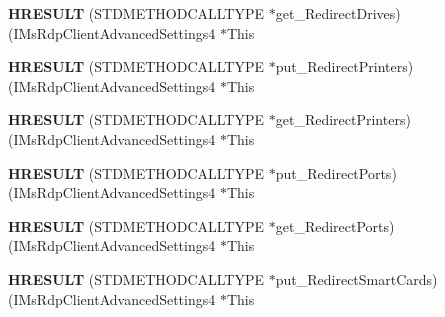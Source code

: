 \begin{DoxyCompactItemize}
\item 
\mbox{\label{struct_i_ms_rdp_client_advanced_settings4_vtbl_a30b7ac330d0b8023a87af0b2d53428a6}} 
{\bfseries H\+R\+E\+S\+U\+LT} (S\+T\+D\+M\+E\+T\+H\+O\+D\+C\+A\+L\+L\+T\+Y\+PE $\ast$get\+\_\+\+Redirect\+Drives)(I\+Ms\+Rdp\+Client\+Advanced\+Settings4 $\ast$This
\item 
\mbox{\label{struct_i_ms_rdp_client_advanced_settings4_vtbl_aaec94c2b7b26e97f7b8e3cb09b70a0ab}} 
{\bfseries H\+R\+E\+S\+U\+LT} (S\+T\+D\+M\+E\+T\+H\+O\+D\+C\+A\+L\+L\+T\+Y\+PE $\ast$put\+\_\+\+Redirect\+Printers)(I\+Ms\+Rdp\+Client\+Advanced\+Settings4 $\ast$This
\item 
\mbox{\label{struct_i_ms_rdp_client_advanced_settings4_vtbl_a376eefe33db8fe926dcd11e6e7f6e3b3}} 
{\bfseries H\+R\+E\+S\+U\+LT} (S\+T\+D\+M\+E\+T\+H\+O\+D\+C\+A\+L\+L\+T\+Y\+PE $\ast$get\+\_\+\+Redirect\+Printers)(I\+Ms\+Rdp\+Client\+Advanced\+Settings4 $\ast$This
\item 
\mbox{\label{struct_i_ms_rdp_client_advanced_settings4_vtbl_add1db4a3b25e68c3799e127320af9680}} 
{\bfseries H\+R\+E\+S\+U\+LT} (S\+T\+D\+M\+E\+T\+H\+O\+D\+C\+A\+L\+L\+T\+Y\+PE $\ast$put\+\_\+\+Redirect\+Ports)(I\+Ms\+Rdp\+Client\+Advanced\+Settings4 $\ast$This
\item 
\mbox{\label{struct_i_ms_rdp_client_advanced_settings4_vtbl_ab755c97ffa77ea0e7c9a9effa7eed4f1}} 
{\bfseries H\+R\+E\+S\+U\+LT} (S\+T\+D\+M\+E\+T\+H\+O\+D\+C\+A\+L\+L\+T\+Y\+PE $\ast$get\+\_\+\+Redirect\+Ports)(I\+Ms\+Rdp\+Client\+Advanced\+Settings4 $\ast$This
\item 
\mbox{\label{struct_i_ms_rdp_client_advanced_settings4_vtbl_a0cd6d4a6aeabd51e7a47f30f82c262bd}} 
{\bfseries H\+R\+E\+S\+U\+LT} (S\+T\+D\+M\+E\+T\+H\+O\+D\+C\+A\+L\+L\+T\+Y\+PE $\ast$put\+\_\+\+Redirect\+Smart\+Cards)(I\+Ms\+Rdp\+Client\+Advanced\+Settings4 $\ast$This
\item 
\mbox{\label{struct_i_ms_rdp_client_advanced_settings4_vtbl_ac30d51b02e24bd788c8785347b2606fc}} 

\end{DoxyCompactItemize}
